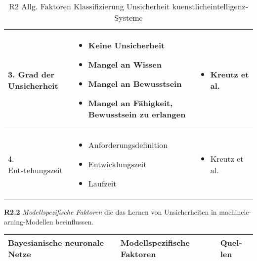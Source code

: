 \begin{otherlanguage}{ngerman}
\begin{table}[!htpb]
\begin{tabularx}{\textwidth}{|l|X|X|}
    \multirow{7}{*}{3. Grad der Unsicherheit} &
    \begin{itemize}[leftmargin=*, topsep=0em, itemsep=0em, label={}]
      \item Keine Unsicherheit
      \item Mangel an Wissen
      \item Mangel an Bewusstsein
      \item Mangel an Fähigkeit, Bewusstsein zu erlangen
    \end{itemize} &
    \begin{itemize}[leftmargin=*, topsep=0em, itemsep=0em, label={}]
      \item Kreutz et al. \parencite[S.~56–58]{AndreasKreutz2022}
    \end{itemize} \\ \hline

    \multirow{5}{*}{4. Entstehungszeit} &
    \begin{itemize}[leftmargin=*, topsep=0em, itemsep=0em, label={}]
      \item Anforderungsdefinition
      \item Entwicklungszeit
      \item Laufzeit
    \end{itemize} &
    \begin{itemize}[leftmargin=*, topsep=0em, itemsep=0em, label={}]
      \item Kreutz et al. \parencite[S.~60]{AndreasKreutz2022}
    \end{itemize} \\ \hline
  \end{tabularx}
  \caption{R2 Allg. Faktoren Klassifizierung Unsicherheit \gls{kuenstlicheintelligenz}-Systeme}
  \label{tab:chapter6r21}
\end{table}

\newpage

\textbf{R2.2} \textit{Modellspezifische Faktoren} die das Lernen von Unsicherheiten in \gls{machinelearning}-Modellen beeinflussen.

\begin{table}[!htpb]
  \centering
  \footnotesize
  \begin{tabularx}{\textwidth}{|l|X|X|}
    \hline
    \textbf{\gls{Bayesianische neuronale Netze}} & \hspace{0.6em}\textbf{Modellspezifische Faktoren} & \hspace{0.6em}\textbf{Quellen} \\ \hline


\end{tabularx}
\end{table}
\end{otherlanguage}
